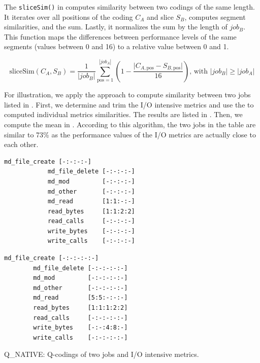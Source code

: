 \documentclass{jhps}
\begin{document}
The \texttt{sliceSim()} in  computes similarity between two codings of the same length.
It iterates over all positions of the coding $C_A$ and slice $S_B$, computes segment similarities, and the sum.
Lastly, it normalizes the sum by the length of $job_B$.
This function maps the differences between performance levels of the same segments (values between 0 and 16) to a relative value between 0 and 1.

\begin{equation}
	\text{sliceSim}\left(C_{A},S_{B}\right) = \frac{1}{|job_B|}\sum_{\text{pos}=1}^{|job_A|} \left(1 - \frac{\vert C_{A,\text{pos}}-S_{B,\text{pos}} \vert }{16}\right)\text{, with }|job_{B}| \geq |job_{A}| \label{eq:slicesim}
\end{equation}

For illustration, we apply the approach to compute similarity between two jobs listed in .
First, we determine and trim the I/O intensive metrics and use the  to computed individual metrics similarities.
The results are listed in .
Then, we compute the mean in .
According to this algorithm, the two jobs in the table are similar to 73\% as the performance values of the I/O metrics are actually close to each other.

\begin{listing}
		\noindent\begin{minipage}{0.49\textwidth}
			\begin{lstlisting}[basicstyle=\fontsize{8}{8}\ttfamily]
			md_file_create [-:-:-:-]
			md_file_delete [-:-:-:-]
			md_mod         [-:-:-:-]
			md_other       [-:-:-:-]
			md_read        [1:1:-:-]
			read_bytes     [1:1:2:2]
			read_calls     [-:-:-:-]
			write_bytes    [-:-:-:-]
			write_calls    [-:-:-:-]
			\end{lstlisting}
			\vspace{-2em}
		\end{minipage}
		\noindent\begin{minipage}{0.49\textwidth}
		\begin{lstlisting}[basicstyle=\fontsize{8}{8}\ttfamily]
		md_file_create [-:-:-:-:-]
		md_file_delete [-:-:-:-:-]
		md_mod         [-:-:-:-:-]
		md_other       [-:-:-:-:-]
		md_read        [5:5:-:-:-]
		read_bytes     [1:1:1:2:2]
		read_calls     [-:-:-:-:-]
		write_bytes    [-:-:4:8:-]
		write_calls    [-:-:-:-:-]
		\end{lstlisting}
		\vspace{-2em}
		\end{minipage}
	\caption{Q\_NATIVE: Q-codings of two jobs and I/O intensive metrics.}
  \label{lst:sim:hex_native:jobs}
\end{listing}
\end{document}
